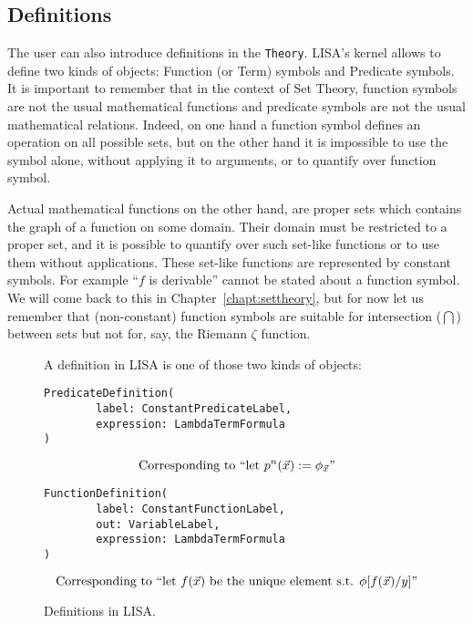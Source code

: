 \subsection{Definitions}
\label{subs:definitions}
The user can also introduce definitions in the \lstinline{Theory}{}. 
LISA's kernel allows to define two kinds of objects: Function (or Term) symbols and Predicate symbols. It is important to remember that in the context of Set Theory, function symbols are not the usual mathematical functions and predicate symbols are not the usual mathematical relations. Indeed, on one hand a function symbol defines an operation on all possible sets, but on the other hand it is impossible to use the symbol alone, without applying it to arguments, or to quantify over function symbol.

Actual mathematical functions on the other hand, are proper sets which contains the graph of a function on some domain. Their domain must be restricted to a proper set, and it is possible to quantify over such set-like functions or to use them without applications. These set-like functions are represented by constant symbols.  For example ``$f$ is derivable'' cannot be stated about a function symbol. We will come back to this in Chapter~\ref{chapt:settheory}, but for now let us remember that (non-constant) function symbols are suitable for intersection ($\bigcap$) between sets but not for, say, the Riemann $\zeta$ function.


\begin{figure}
A definition in LISA is one of those two kinds of objects:
\begin{lstlisting}[frame=single]
PredicateDefinition(
		label: ConstantPredicateLabel,
		expression: LambdaTermFormula
)
\end{lstlisting}
$$
\textnormal{Corresponding to ``let } p^n(\vec{x}) := \phi_{\vec{x}}\textnormal{''}
$$
\begin{lstlisting}[frame=single]
FunctionDefinition(
		label: ConstantFunctionLabel,
		out: VariableLabel, 
		expression: LambdaTermFormula
)
\end{lstlisting}
$$
\textnormal{Corresponding to ``let } f(\vec{x}) \textnormal{ be the unique element s.t. } \phi[f(\vec{x})/y]\textnormal{''}
$$
\caption{Definitions in LISA.}
\label{fig:definitions}
\end{figure}

